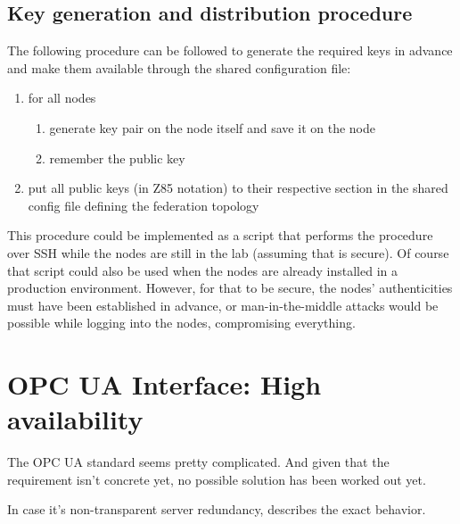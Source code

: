 \subsection{Key generation and distribution procedure}
The following procedure can be followed to generate the required keys in
advance and make them available through the shared configuration file:

\begin{enumerate}
	\item for all nodes
	\begin{enumerate}
		\item generate key pair on the node itself and save it on the
			node
		\item remember the public key
	\end{enumerate}

	\item put all public keys (in Z85 notation) to their respective section
		in the shared config file defining the federation topology
\end{enumerate}

This procedure could be implemented as a script that performs the procedure
over \gls{SSH} while the nodes are still in the
lab (assuming that is secure). Of course that script could also be used when
the nodes are already installed in a production environment. However, for that to be
secure, the nodes' authenticities must have been established in advance, or
man-in-the-middle attacks would be possible while logging into the nodes,
compromising everything.

\section{OPC UA Interface: High availability}\label{sec:approach:opc-ua}
The OPC UA standard seems pretty complicated. And given that the requirement
isn't concrete yet, no possible solution has been worked out yet.

In case it's non-transparent server redundancy, \cite[6.4.2.4 Non-transparent
Redundancy, p.~96]{opc-ua:behavior:server-redundancy} describes the exact
behavior.

